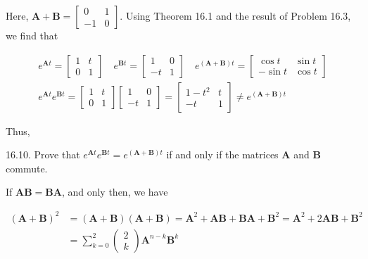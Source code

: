 \documentclass[10pt]{article}
\begin{document}
Here, $\mathbf{A}+\mathbf{B}=\left[\begin{array}{rr}0 & 1 \\ -1 & 0\end{array}\right]$. Using Theorem 16.1 and the result of Problem 16.3, we find that

$$
\begin{gathered}
e^{\mathbf{A} t}=\left[\begin{array}{ll}
1 & t \\
0 & 1
\end{array}\right] \quad e^{\mathbf{B} t}=\left[\begin{array}{rr}
1 & 0 \\
-t & 1
\end{array}\right] \quad e^{(\mathbf{A}+\mathbf{B}) t}=\left[\begin{array}{cc}
\cos t & \sin t \\
-\sin t & \cos t
\end{array}\right] \\
e^{\mathbf{A} t} e^{\mathbf{B} t}=\left[\begin{array}{ll}
1 & t \\
0 & 1
\end{array}\right]\left[\begin{array}{rr}
1 & 0 \\
-t & 1
\end{array}\right]=\left[\begin{array}{cc}
1-t^{2} & t \\
-t & 1
\end{array}\right] \neq e^{(\mathbf{A}+\mathbf{B}) t}
\end{gathered}
$$

Thus,

16.10. Prove that $e^{\mathbf{A} t} e^{\mathbf{B} t}=e^{(\mathbf{A}+\mathbf{B}) t}$ if and only if the matrices $\mathbf{A}$ and $\mathbf{B}$ commute.

If $\mathbf{A B}=\mathbf{B A}$, and only then, we have

$$
\begin{aligned}
(\mathbf{A}+\mathbf{B})^{2} & =(\mathbf{A}+\mathbf{B})(\mathbf{A}+\mathbf{B})=\mathbf{A}^{2}+\mathbf{A B}+\mathbf{B} \mathbf{A}+\mathbf{B}^{2}=\mathbf{A}^{2}+2 \mathbf{A B}+\mathbf{B}^{2} \\
& =\sum_{k=0}^{2}\left(\begin{array}{l}
2 \\
k
\end{array}\right) \mathbf{A}^{n-k} \mathbf{B}^{k}
\end{aligned}
$$
\end{document}

